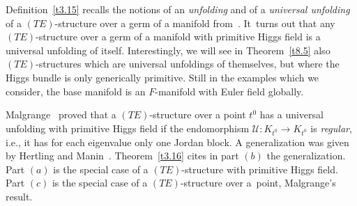 \documentclass[10pt,a4paper]{amsart}
\numberwithin{equation}{section}
\numberwithin{figure}{section}
\newcommand{\UU}{{\mathcal U}}
\begin{document}
Definition~\ref{t3.15} recalls the notions of an
{\it unfolding} and of a {\it universal unfolding}
of a $(TE)$-structure over a germ of a manifold
from~\cite[Definition 2.3]{HM04}. It~turns out that any $(TE)$-structure over a germ of a manifold
with primitive Higgs field is a universal unfolding of itself.
Interestingly, we will see in Theorem~\ref{t8.5}
also $(TE)$-structures which are universal unfoldings
of themselves, but where the Higgs bundle is only
generically primitive. Still in the examples which
we consider, the base manifold is an $F$-manifold with
Euler field globally.

Malgrange~\cite{Ma86} proved that a $(TE)$-structure
over a point $t^0$ has a universal unfolding
with primitive Higgs field if the endomorphism
$\UU\colon K_{t^0}\to K_{t^0}$ is {\it regular}, i.e.,
it has for each eigenvalue only one Jordan block.
A generalization was given by Hertling and Manin~\cite[Theorem~2.5]{HM04}.
Theorem~\ref{t3.16} cites in part $(b)$
the generalization.
Part $(a)$ is the special case of a $(TE)$-structure
with primitive Higgs field.
Part $(c)$ is the special case of a $(TE)$-structure
over a~point, Malgrange's result.
\end{document}

